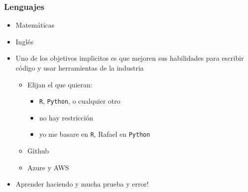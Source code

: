 \documentclass[
  shownotes,
  xcolor={svgnames},
  hyperref={colorlinks,citecolor=DarkBlue,linkcolor=DarkRed,urlcolor=DarkBlue}
  , aspectratio=169]{beamer}
\begin{document}
\begin{frame}
\frametitle{Lenguajes}


\begin{minipage}[t]{0.58\linewidth}
        \begin{itemize}
            \item Matemáticas
            \bigskip
            \item Inglés
            \bigskip
            \item Uno de los objetivos implicitos es que mejoren sus habilidades para escribir código y usar herramientas de la industria
            \begin{itemize}
              \item Elijan el que quieran: 
              \begin{itemize}
                \item \texttt{R}, \texttt{Python}, o cualquier otro
                \item no hay restricción
                \item yo me basare en \texttt{R}, Rafael en \texttt{Python}
                \end{itemize}
              \item Github
              \item Azure y AWS
            \end{itemize}
            \item Aprender haciendo y mucha prueba y error! 
            

\end{itemize}
\end{minipage}
\end{frame}
\end{document}
